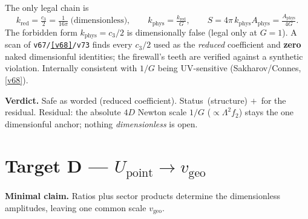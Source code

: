 \documentclass[11pt,a4paper]{article}
\newcommand{\cthree}{c_3}
\newcommand{\vgeo}{v_{\mathrm{geo}}}
\begin{document}
\begin{winbox}
The only legal chain is
\[
  k_{\mathrm{red}}=\tfrac{\cthree}{2}=\tfrac{1}{16\pi}\ \text{(dimensionless)},\qquad
  k_{\mathrm{phys}}=\tfrac{k_{\mathrm{red}}}{G},\qquad
  S=4\pi\,k_{\mathrm{phys}}A_{\mathrm{phys}}=\tfrac{A_{\mathrm{phys}}}{4G}.
\]
The forbidden form $k_{\mathrm{phys}}=\cthree/2$ is dimensionally false (legal only at $G=1$). A
scan of \texttt{v67/\vref{v68}/v73} finds every $\cthree/2$ used as the \emph{reduced} coefficient and
\textbf{zero} naked dimensionful identities; the firewall's teeth are verified against a synthetic
violation. Internally consistent with $1/G$ being UV-sensitive (Sakharov/Connes, \vref{v68}).
\end{winbox}

\noindent\textbf{Verdict.} Safe as worded (reduced coefficient). Status \mE\,(structure) $+$ \mO\,for
the residual. Residual: the absolute $4D$ Newton scale $1/G$ ($\propto \Lambda^2 f_2$) stays the one
dimensionful anchor; nothing \emph{dimensionless} is open.

\section*{Target D --- $U_{\mathrm{point}}\to\vgeo$}\label{sec:D}
\noindent\textbf{Minimal claim.} Ratios plus sector products determine the dimensionless amplitudes,
leaving one common scale $\vgeo$.
\end{document}
